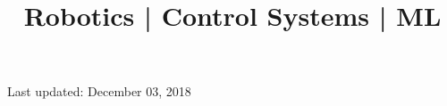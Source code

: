 \documentclass[10pt,a4paper]{moderncv}
\title{Robotics | Control Systems  | ML \newline
\bf{\lb{\footnotesize
Rerum Cognoscere Causas: To know the causes of things.} }}
\begin{document}
	\makecvtitle
	
	
	
	
	
	
	
	
	
	
	
	
	
%
	\footnotesize \centering Last updated: December 03, 2018
\renewcommand{\listitemsymbol}{-}
\clearpage
\end{document}
